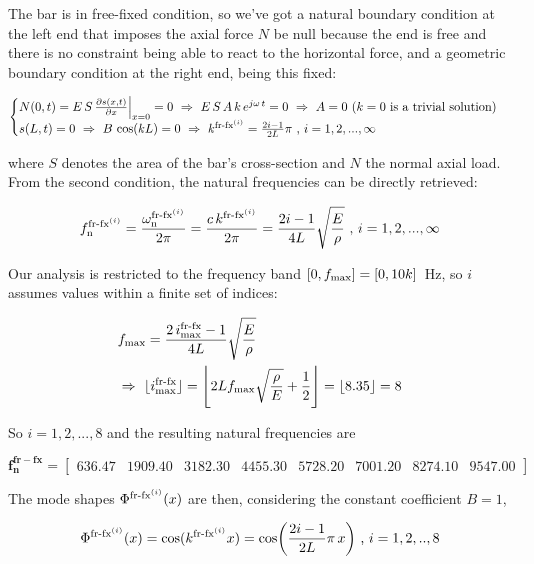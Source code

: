 \documentclass[a4paper,12pt,oneside]{article}
\begin{document}
The bar is in free-fixed condition, so we've got a natural boundary condition at the left end that imposes the axial force $ N $ be null because the end is free and there is no constraint being able to react to the horizontal force, and a geometric boundary condition at the right end, being this fixed:

\[ \begin{cases}
	N(0,t) = E \, S \, \frac{\partial s(x,t)}{\partial x}\Big|_{x=0} = 0
		~ \Rightarrow ~ E \, S \, A \, k \, e^{j \omega \, t} = 0
		~ \Rightarrow ~ A = 0 ~ \text{($ k = 0 $ is a trivial solution)} \\
	s(L,t) = 0 ~ \Rightarrow ~ B \, \cos(kL) = 0 ~ \Rightarrow ~
		k^{\textup{fr-fx}^{(i)}} = \frac{2i - 1}{2L} \pi
		~ \text{,} ~ i = 1,2,...,\infty
\end{cases} \]

where $ S $ denotes the area of the bar's cross-section and $ N $ the normal axial load. From the second condition, the natural frequencies can be directly retrieved:

\[
	f_\textup{n}^{\textup{fr-fx}^{(i)}} =
		\frac{\omega_\textup{n}^{\textup{fr-fx}^{(i)}}}{2 \pi} =
		\frac{c \, k^{\textup{fr-fx}^{(i)}}}{2 \pi} =
		\frac{2i - 1}{4L} \sqrt{\frac{E}{\rho}} ~ \text{,} ~ i = 1,2,...,\infty
\]

Our analysis is restricted to the frequency band $ [0, f_\textup{max}] = [0, 10k] \, $ Hz, so $ i $ assumes values within a finite set of indices:

\[ \begin{split}
	& f_\textup{max} = \frac{2 \, i^\textup{fr-fx}_\textup{max} - 1}{4L}
		\sqrt{\frac{E}{\rho}} \\
	& \Rightarrow ~ \lfloor i^\textup{fr-fx}_\textup{max} \rfloor =
		\Biggl\lfloor 2 L f_\textup{max}
		\sqrt{\frac{\rho}{E}} + \frac{1}{2} \Biggr\rfloor = \lfloor 8.35 \rfloor = 8
\end{split} \]

So $ i = 1,2,...,8 $ and the resulting natural frequencies are

\[
	\mathbf{f_n^{fr-fx}} =	\begin{bmatrix}
														636.47		& 1909.40	& 3182.30	& 4455.30
														& 5728.20	& 7001.20	& 8274.10	& 9547.00
													\end{bmatrix}
\]

The mode shapes $ \Phi^{\textup{fr-fx}^{(i)}}(x) $ are then, considering the constant coefficient $ B = 1 $,

\[
	\Phi^{\textup{fr-fx}^{(i)}}(x) = \cos(k^{\textup{fr-fx}^{(i)}} x) =
		\cos\biggl(\frac{2i - 1}{2L} \pi \, x\biggr) ~ \text{,} ~ i = 1,2,..,8
\]
\end{document}
